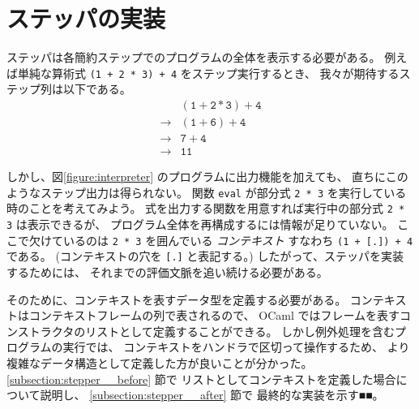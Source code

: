 \section{ステッパの実装}
\label{section:try-with__stepper}

ステッパは各簡約ステップでのプログラムの全体を表示する必要がある。
例えば単純な算術式 \texttt{(1 + 2 * 3) + 4} をステップ実行するとき、
我々が期待するステップ列は以下である。
\[
\begin{array}{cl}
            & \mathtt{(1 + 2 * 3) + 4} \\
\rightarrow & \mathtt{(1 + 6) + 4} \\
\rightarrow & \mathtt{7 + 4} \\
\rightarrow & \mathtt{11}
\end{array}
\]

しかし、図\ref{figure:interpreter} のプログラムに出力機能を加えても、
直ちにこのようなステップ出力は得られない。
関数 \texttt{eval} が部分式 \texttt{2 * 3} を実行している時のことを考えてみよう。
式を出力する関数を用意すれば実行中の部分式 \texttt{2 * 3} は表示できるが、
プログラム全体を再構成するには情報が足りていない。
ここで欠けているのは \texttt{2 * 3} を囲んでいる \emph{コンテキスト} すなわち
\texttt{(1 + [.])\ + 4} である。
(コンテキストの穴を \texttt{[.]} と表記する。)
したがって、ステッパを実装するためには、
それまでの評価文脈を追い続ける必要がある。

そのために、コンテキストを表すデータ型を定義する必要がある。
コンテキストはコンテキストフレームの列で表されるので、
OCaml ではフレームを表すコンストラクタのリストとして定義することができる。
しかし例外処理を含むプログラムの実行では、
コンテキストをハンドラで区切って操作するため、
より複雑なデータ構造として定義した方が良いことが分かった。
\ref{subsection:stepper__before} 節で
リストとしてコンテキストを定義した場合について説明し、
\ref{subsection:stepper__after} 節で
最終的な実装を示す■■。

